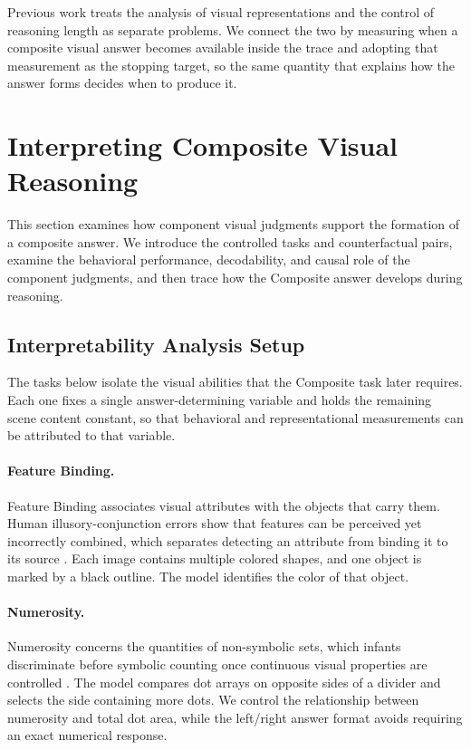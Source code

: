 \documentclass{article} %
\begin{document}
Previous work treats the analysis of visual representations and the control of reasoning length as separate problems. We connect the two by measuring when a composite visual answer becomes available inside the trace and adopting that measurement as the stopping target, so the same quantity that explains how the answer forms decides when to produce it.
\section{Interpreting Composite Visual Reasoning}
\label{sec:interpretability}

This section examines how component visual judgments support the formation of a composite answer. We introduce the controlled tasks and counterfactual pairs, examine the behavioral performance, decodability, and causal role of the component judgments, and then trace how the Composite answer develops during reasoning.

\subsection{Interpretability Analysis Setup}
\label{sec:primitive}

The tasks below isolate the visual abilities that the Composite task later requires. Each one fixes a single answer-determining variable and holds the remaining scene content constant, so that behavioral and representational measurements can be attributed to that variable.

\paragraph{Feature Binding.}
Feature Binding associates visual attributes with the objects that carry them. Human illusory-conjunction errors show that features can be perceived yet incorrectly combined, which separates detecting an attribute from binding it to its source \citep{treisman1980feature,treisman1982illusory}. Each image contains multiple colored shapes, and one object is marked by a black outline. The model identifies the color of that object.

\paragraph{Numerosity.}
Numerosity concerns the quantities of non-symbolic sets, which infants discriminate before symbolic counting once continuous visual properties are controlled \citep{feigenson2004core,xu2000large}. The model compares dot arrays on opposite sides of a divider and selects the side containing more dots. We control the relationship between numerosity and total dot area, while the left/right answer format avoids requiring an exact numerical response.
\end{document}
